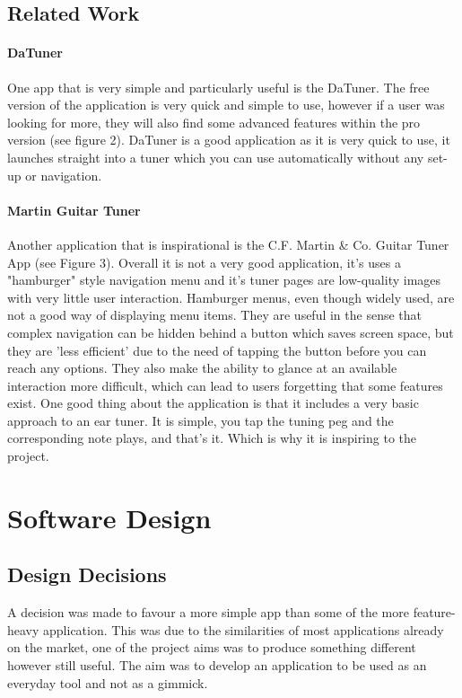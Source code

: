 \documentclass[conference]{acmsiggraph}
\begin{document}
\subsection{Related Work}

\paragraph{DaTuner} One app that is very simple and particularly useful is the DaTuner. The free version of the application is very quick and simple to use, however if a user was looking for more, they will also find some advanced features within the pro version (see figure 2). DaTuner is a good application as it is very quick to use, it launches straight into a tuner which you can use automatically without any set-up or navigation.

\paragraph{Martin Guitar Tuner} Another application that is inspirational is the C.F. Martin \& Co. Guitar Tuner App (see Figure 3). Overall it is not a very good application, it's uses a "hamburger" style navigation menu and it's tuner pages are low-quality images with very little user interaction. Hamburger menus, even though widely used, are not a good way of displaying menu items. They are useful in the sense that complex navigation can be hidden behind a button which saves screen space, but they are 'less efficient' due to the need of tapping the button before you can reach any options. They also make the ability to glance at an available interaction more difficult, which can lead to users forgetting that some features exist. \cite{hamburger} One good thing about the application is that it includes a very basic approach to an ear tuner. It is simple, you tap the tuning peg and the corresponding note plays, and that's it. Which is why it is inspiring to the project.

\section{Software Design}

\subsection{Design Decisions}

A decision was made to favour a more simple app than some of the more feature-heavy application. This was due to the similarities of most applications already on the market, one of the project aims was to produce something different however still useful. The aim was to develop an application to be used as an everyday tool and not as a gimmick.
\end{document}
